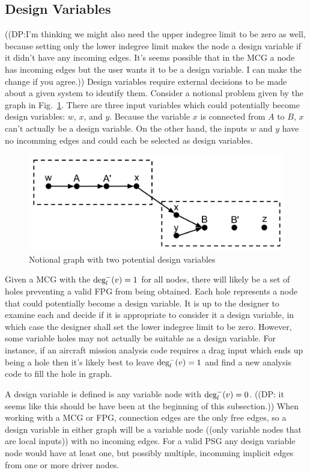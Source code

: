\subsection{Design Variables}
((DP:I'm thinking we might also need the upper indegree limit to be zero as well, because setting only the lower indegree limit makes the node a design variable if it didn't have any incoming edges. It's seems possible that in the MCG a node has incoming edges but the user wants it to be a design variable. I can make the change if you agree.))
Design variables require external decisions 
to be made about a given system to identify them. Consider 
a notional problem given by the graph in Fig.~\ref{f:designvars}. There are three input variables 
which could potentially become design variables: $w$, $x$, and $y$. Because the variable $x$ is connected from $A$ to $B$,
 $x$ can't actually be a design variable. On the other hand, the inputs $w$ and $y$
have no incomming edges and could each be selected as design variables. 
\begin{figure}[htb!]
  \begin{center}
    \includegraphics[width=.6\textwidth]{images/design_vars_graph}
  \end{center}
  \caption{Notional graph with two potential design variables \label{f:designvars}}
\end{figure}

Given a MCG with the $\textrm{deg}_l^-(v)=1$ for all nodes, there will likely be a set of holes preventing a valid FPG from being obtained.
Each hole represents a node that could potentially become a design variable. 
It is up to the designer to examine each and decide if it is appropriate to 
consider it a design variable, in which case the designer shall set the lower indegree limit to be zero. However, some variable holes may not actually be suitable as a design variable. For instance, if an aircraft mission analysis code requires a drag input 
which ends up being a hole then it's likely best to leave
$\textrm{deg}_l^-(v)=1$ and find a new analysis code to fill the hole in graph. 

A design variable is defined is any variable node with $\textrm{deg}_l^-(v)=0$. ((DP: it seems like this should be have been at the beginning of this subsection.)) 
When working with a MCG or FPG, connection edges are the only free edges, so a design 
variable in either graph will be a variable node ((only variable nodes that are local inputs)) with no incoming edges. For a valid PSG 
any design variable node would have at least one, but possibly multiple, incomming 
implicit edges from one or more driver nodes. 

